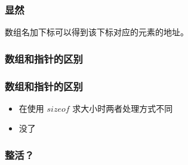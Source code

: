 \documentclass{beamer}
\begin{document}
\begin{frame}
  \frametitle{显然}

  数组名加下标可以得到该下标对应的元素的地址。

\end{frame}

\begin{frame}
  \frametitle{数组和指针的区别}
  
\end{frame}

\begin{frame}
 \frametitle{数组和指针的区别}
 \begin{itemize}
   \item 在使用 \(sizeof\) 求大小时两者处理方式不同
   \item 没了
 \end{itemize}
\end{frame}

\begin{frame}
  \frametitle{整活？}
  
\end{frame}
\end{document}
